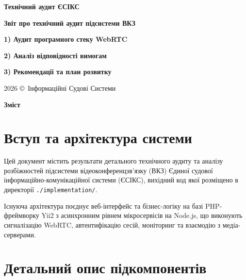 \documentclass{article}
\newcommand\HUGE[1]{\fontsize{40}{40}\selectfont #1}
\begin{document}
\pagestyle{fancy}

\begin{titlepage}
  \AddToShipoutPictureBG*{\AtPageLowerLeft{\color{nato}\rule{\paperwidth}{\paperheight}}}
  \color{white}\thispagestyle{empty}\vspace*{4cm}\centering
  {\Huge  \textbf{Технічний аудит ЄСІКС} \par} \vspace{2cm}
  {\HUGE  \textbf{Звіт про технічний аудит підсистеми ВКЗ} \par} \vspace{2.5cm}
  {\LARGE \textbf{1) Аудит програмного стеку WebRTC} \par}
  {\LARGE \textbf{2) Аналіз відповідності вимогам} \par}
  {\LARGE \textbf{3) Рекомендації та план розвитку} \par} \vspace{2.5cm}
  \vfill
  {\large 2026 \copyright\ Інформаційні Судові Системи \par}
\end{titlepage}

\newpage

\begin{center}
  {\Huge\color{nato}\bfseries Зміст\par}
\end{center}
\vspace{40pt}
\tableofcontents

\newpage

\section{Вступ та архітектура системи}
Цей документ містить результати детального технічного аудиту та аналізу розбіжностей підсистеми відеоконференцзв'язку (ВКЗ) Єдиної судової інформаційно-комунікаційної системи (ЄСІКС), вихідний код якої розміщено в директорії \texttt{./implementation/}.

Існуюча архітектура поєднує веб-інтерфейс та бізнес-логіку на базі PHP-фреймворку Yii2 з асинхронним рівнем мікросервісів на Node.js, що виконують сигналізацію WebRTC, автентифікацію сесій, моніторинг та взаємодію з медіа-серверами.

\section{Детальний опис підкомпонентів}
\end{document}
